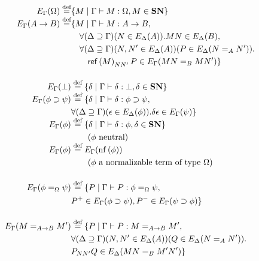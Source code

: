 \begin{definition}
\label{df:computable}
\begin{align*}
E_\Gamma(\Omega) \mathrel{\smash{\stackrel{\text{def}}{=}}} & \{ M \mid \Gamma \vdash M : \Omega, M \in \mathbf{SN} \} \\
E_\Gamma(A \rightarrow B) \mathrel{\smash{\stackrel{\text{def}}{=}}} & \{ M \mid \Gamma \vdash M : A \rightarrow B, \\
& \quad \forall (\Delta \supseteq \Gamma) (N \in E_\Delta(A)). MN \in E_\Delta(B), \\
& \quad \forall (\Delta \supseteq \Gamma) (N, N' \in E_\Delta(A)) (P \in E_\Delta(N =_A N')). \\
& \quad \quad \mathsf{ref} \left( {M} \right)_{N N'} P \in E_\Gamma(MN =_B MN') \} \\
\\
E_\Gamma(\bot) & \mathrel{\smash{\stackrel{\text{def}}{=}}} \{ \delta \mid \Gamma \vdash \delta : \bot, \delta \in \mathbf{SN} \} \\
E_\Gamma(\phi \supset \psi) & \mathrel{\smash{\stackrel{\text{def}}{=}}} \{ \delta \mid \Gamma \vdash \delta : \phi \supset \psi, \\
& \forall (\Delta \supseteq \Gamma)(\epsilon \in E_\Delta(\phi)). \delta \epsilon \in E_\Gamma(\psi) \} \\
E_\Gamma(\phi) & \mathrel{\smash{\stackrel{\text{def}}{=}}} \{ \delta \mid \Gamma \vdash \delta : \phi, \delta \in \mathbf{SN} \} \\
& \qquad (\phi \text{ neutral}) \\
E_\Gamma(\phi) & \mathrel{\smash{\stackrel{\text{def}}{=}}} E_\Gamma(\mathrm{nf} \left( {\phi} \right)) \\
& \qquad (\phi \mbox{ a normalizable term of type $\Omega$}) \\
\\
E_\Gamma(\phi =_\Omega \psi) & \mathrel{\smash{\stackrel{\text{def}}{=}}} \{ P \mid \Gamma \vdash P : \phi =_\Omega \psi, \\
& P^+ \in E_\Gamma(\phi \supset \psi), P^- \in E_\Gamma(\psi \supset \phi) \} \\
\\
E_\Gamma(M =_{A \rightarrow B} M') & \mathrel{\smash{\stackrel{\text{def}}{=}}} \{ P \mid \Gamma \vdash P : M =_{A \rightarrow B} M', \\
& \forall (\Delta \supseteq \Gamma) (N, N' \in E_\Delta(A)) (Q \in E_\Delta(N =_A N')). \\
& P_{NN'}Q \in E_\Delta(MN =_B M'N') \}
\end{align*}
\end{definition}

